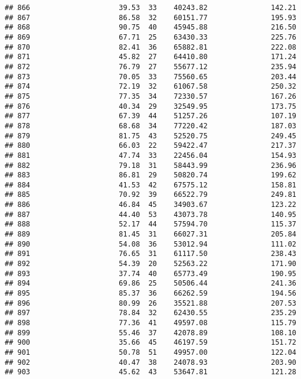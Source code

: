 \documentclass[
]{article}
\begin{document}
\begin{verbatim}
## 866                     39.53  33    40243.82               142.21
## 867                     86.58  32    60151.77               195.93
## 868                     90.75  40    45945.88               216.50
## 869                     67.71  25    63430.33               225.76
## 870                     82.41  36    65882.81               222.08
## 871                     45.82  27    64410.80               171.24
## 872                     76.79  27    55677.12               235.94
## 873                     70.05  33    75560.65               203.44
## 874                     72.19  32    61067.58               250.32
## 875                     77.35  34    72330.57               167.26
## 876                     40.34  29    32549.95               173.75
## 877                     67.39  44    51257.26               107.19
## 878                     68.68  34    77220.42               187.03
## 879                     81.75  43    52520.75               249.45
## 880                     66.03  22    59422.47               217.37
## 881                     47.74  33    22456.04               154.93
## 882                     79.18  31    58443.99               236.96
## 883                     86.81  29    50820.74               199.62
## 884                     41.53  42    67575.12               158.81
## 885                     70.92  39    66522.79               249.81
## 886                     46.84  45    34903.67               123.22
## 887                     44.40  53    43073.78               140.95
## 888                     52.17  44    57594.70               115.37
## 889                     81.45  31    66027.31               205.84
## 890                     54.08  36    53012.94               111.02
## 891                     76.65  31    61117.50               238.43
## 892                     54.39  20    52563.22               171.90
## 893                     37.74  40    65773.49               190.95
## 894                     69.86  25    50506.44               241.36
## 895                     85.37  36    66262.59               194.56
## 896                     80.99  26    35521.88               207.53
## 897                     78.84  32    62430.55               235.29
## 898                     77.36  41    49597.08               115.79
## 899                     55.46  37    42078.89               108.10
## 900                     35.66  45    46197.59               151.72
## 901                     50.78  51    49957.00               122.04
## 902                     40.47  38    24078.93               203.90
## 903                     45.62  43    53647.81               121.28

\end{verbatim}
\end{document}
